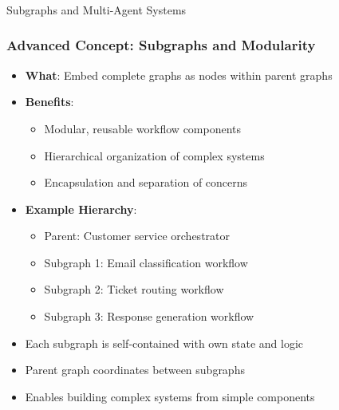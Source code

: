 \begin{frame}[fragile]\frametitle{}
\begin{center}
{\Large Subgraphs and Multi-Agent Systems}
\end{center}
\end{frame}
\begin{frame}[fragile]\frametitle{Advanced Concept: Subgraphs and Modularity}
      \begin{itemize}
        \item \textbf{What}: Embed complete graphs as nodes within parent graphs
        \item \textbf{Benefits}:
        \begin{itemize}
            \item Modular, reusable workflow components
            \item Hierarchical organization of complex systems
            \item Encapsulation and separation of concerns
        \end{itemize}
        \item \textbf{Example Hierarchy}:
        \begin{itemize}
            \item Parent: Customer service orchestrator
            \item Subgraph 1: Email classification workflow
            \item Subgraph 2: Ticket routing workflow
            \item Subgraph 3: Response generation workflow
        \end{itemize}
        \item Each subgraph is self-contained with own state and logic
        \item Parent graph coordinates between subgraphs
        \item Enables building complex systems from simple components
      \end{itemize}
\end{frame}
